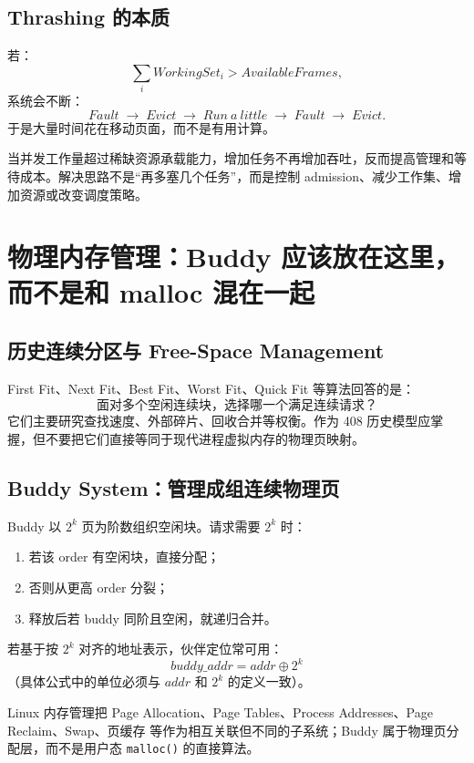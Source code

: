 \documentclass[11pt,a4paper]{ctexart}
\newcommand{\code}[1]{\texttt{#1}}
\newcommand{\arr}{\;\longrightarrow\;}
\begin{document}
\subsection{Thrashing 的本质}
若：
\[
\sum_i WorkingSet_i > AvailableFrames,
\]
系统会不断：
\[
Fault\arr Evict\arr Run\ a\ little\arr Fault\arr Evict.
\]
于是大量时间花在移动页面，而不是有用计算。

\begin{bridge}
当并发工作量超过稀缺资源承载能力，增加任务不再增加吞吐，反而提高管理和等待成本。解决思路不是“再多塞几个任务”，而是控制 admission、减少工作集、增加资源或改变调度策略。
\end{bridge}

\section{物理内存管理：Buddy 应该放在这里，而不是和 malloc 混在一起}

\subsection{历史连续分区与 Free-Space Management}
First Fit、Next Fit、Best Fit、Worst Fit、Quick Fit 等算法回答的是：
\[
\boxed{\text{面对多个空闲连续块，选择哪一个满足连续请求？}}
\]
它们主要研究查找速度、外部碎片、回收合并等权衡。作为 408 历史模型应掌握，但不要把它们直接等同于现代进程虚拟内存的物理页映射。

\subsection{Buddy System：管理成组连续物理页}
Buddy 以 $2^k$ 页为阶数组织空闲块。请求需要 $2^k$ 时：
\begin{enumerate}
  \item 若该 order 有空闲块，直接分配；
  \item 否则从更高 order 分裂；
  \item 释放后若 buddy 同阶且空闲，就递归合并。
\end{enumerate}
若基于按 $2^k$ 对齐的地址表示，伙伴定位常可用：
\[
\boxed{buddy\_addr = addr \oplus 2^k}
\]
（具体公式中的单位必须与 $addr$ 和 $2^k$ 的定义一致）。

\begin{eng}[工程定位]
Linux 内存管理把 Page Allocation、Page Tables、Process Addresses、Page Reclaim、Swap、页缓存 等作为相互关联但不同的子系统；Buddy 属于物理页分配层，而不是用户态 \code{malloc()} 的直接算法。
\end{eng}
\end{document}

